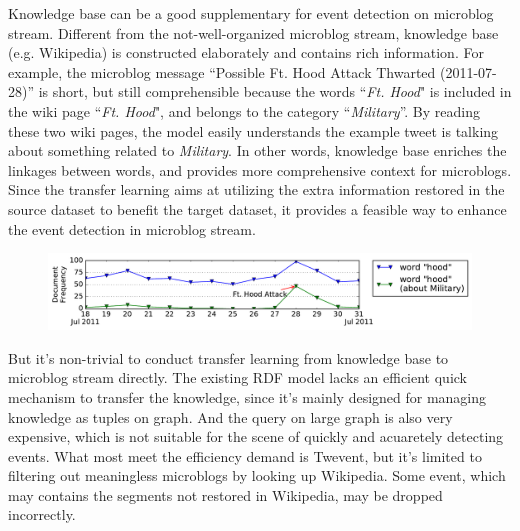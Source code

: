 \documentclass{article}
\begin{document}
Knowledge base can be a good supplementary for event detection on microblog stream.
Different from the not-well-organized microblog stream, knowledge base (e.g. Wikipedia) is constructed elaborately and contains rich information. 
For example, the microblog message ``Possible Ft. Hood Attack Thwarted (2011-07-28)'' is short, but still comprehensible because the words ``\textit{Ft. Hood}" is included in the wiki page ``\textit{Ft. Hood}", and belongs to the category ``\textit{Military}''.
By reading these two wiki pages, the model easily understands the example tweet is talking about something related to \textit{Military}.
In other words, knowledge base enriches the linkages between words, and provides more comprehensive context for microblogs.
Since the transfer learning\cite{pan2010survey} aims at utilizing the extra information restored in the source dataset to benefit the target dataset, it provides a feasible way to enhance the event detection in microblog stream.
\begin{figure}[h]
        \centering
        \includegraphics[width=1.0\columnwidth]{img/hood.pdf}
        \label{fig:hood}
\end{figure}


But it's non-trivial to conduct transfer learning from knowledge base to microblog stream directly.
The existing RDF model\cite{klyne2006rdf} lacks an efficient quick mechanism to transfer the knowledge, since it's mainly designed for managing knowledge as tuples on graph. And the query on large graph is also very expensive\cite{huang2011scalable}, which is not suitable for the scene of quickly and acuaretely detecting events.
What most meet the efficiency demand is Twevent\cite{Twevent2012}, but it's limited to filtering out meaningless microblogs by looking up Wikipedia. Some event,  which may contains the segments not restored in Wikipedia, may be dropped incorrectly.
\end{document}
